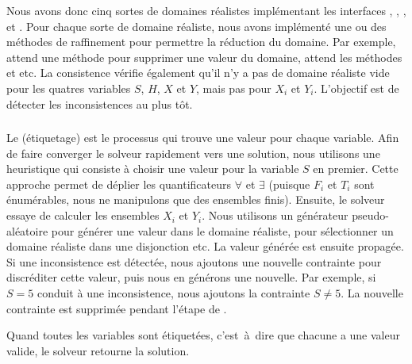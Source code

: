 Nous avons
donc cinq sortes de domaines réalistes implémentant les interfaces
, , ,  et
. Pour chaque sorte de domaine réaliste, nous avons implémenté
une ou des méthodes de raffinement pour permettre la réduction du domaine. Par
exemple,  attend une méthode  pour supprimer une
valeur du domaine,  attend les méthodes  et
 etc. La consistence vérifie également qu'il n'y a pas de
domaine réaliste vide pour les quatres variables $S$, $H$, $X$ et $Y$, mais pas
pour $X_i$ et $Y_i$. L'objectif est de détecter les inconsistences au plus tôt.

\subsubsection{}

Le  (étiquetage) est le processus qui trouve une valeur
pour chaque variable. Afin de faire converger le solveur rapidement vers une
solution, nous utilisons une heuristique qui consiste à choisir une valeur pour
la variable $S$ en premier. Cette approche permet de déplier les quantificateurs
$\forall$ et $\exists$ (puisque $F_i$ et $T_i$ sont énumérables, nous ne
manipulons que des ensembles finis). Ensuite, le solveur essaye de calculer les
ensembles $X_i$ et $Y_i$. Nous utilisons un générateur pseudo-aléatoire pour
générer une valeur dans le domaine réaliste, pour sélectionner un domaine
réaliste dans une disjonction etc. La valeur générée est ensuite propagée. Si
une inconsistence est détectée, nous ajoutons une nouvelle contrainte pour
discréditer cette valeur, puis nous en générons une nouvelle. Par exemple, si $S
= 5$ conduit à une inconsistence, nous ajoutons la contrainte $S \neq 5$. La
nouvelle contrainte est supprimée pendant l'étape de .

Quand toutes les variables sont étiquetées, c'est~à~dire que chacune a une valeur
valide, le solveur retourne la solution.

